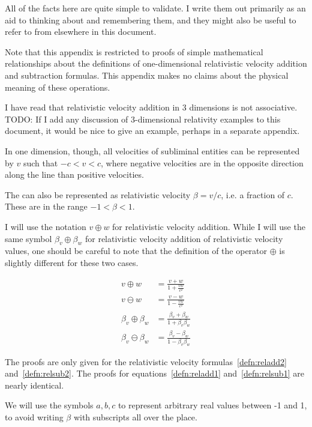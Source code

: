 \documentclass[a4paper]{article}
\theoremstyle{plain}
\theoremstyle{definition}
\begin{document}
All of the facts here are quite simple to validate.  I write them out
primarily as an aid to thinking about and remembering them, and they
might also be useful to refer to from elsewhere in this document.

Note that this appendix is restricted to proofs of simple mathematical
relationships about the definitions of one-dimensional relativistic
velocity addition and subtraction formulas.  This appendix makes no
claims about the physical meaning of these operations.

I have read that relativistic velocity addition in 3 dimensions is not
associative.  TODO: If I add any discussion of 3-dimensional
relativity examples to this document, it would be nice to give an
example, perhaps in a separate appendix.

In one dimension, though, all velocities of subliminal entities can be
represented by $v$ such that $-c < v < c$, where negative velocities
are in the opposite direction along the line than positive velocities.

The can also be represented as relativistic velocity $\beta = v/c$,
i.e. a fraction of $c$.  These are in the range $-1 < \beta < 1$.

I will use the notation $v \oplus w$ for relativistic velocity
addition.  While I will use the same symbol $\beta_v \oplus \beta_w$
for relativistic velocity addition of relativistic velocity values,
one should be careful to note that the definition of the operator
$\oplus$ is slightly different for these two cases.

\begin{align}
v \oplus w & = \frac{v+w}{1+\frac{vw}{c^2}} \label{defn:reladd1} \\
v \ominus w & = \frac{v-w}{1-\frac{vw}{c^2}} \label{defn:relsub1} \\
\beta_v \oplus \beta_w & = \frac{\beta_v+\beta_w}{1+\beta_v \beta_w} \label{defn:reladd2} \\
\beta_v \ominus \beta_w & = \frac{\beta_v-\beta_w}{1- \beta_v \beta_w} \label{defn:relsub2}
\end{align}

The proofs are only given for the relativistic velocity
formulas~\eqref{defn:reladd2} and~\eqref{defn:relsub2}.  The proofs
for equations~\eqref{defn:reladd1}
and~\eqref{defn:relsub1} are nearly identical.

We will use the symbols $a, b, c$ to represent arbitrary real values
between -1 and 1, to avoid writing $\beta$ with subscripts all over
the place.
\end{document}
